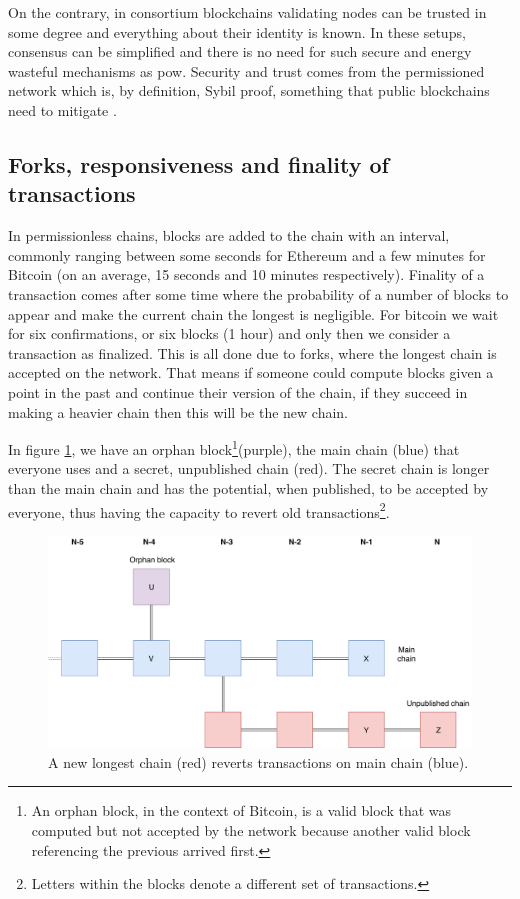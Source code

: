 On the contrary, in consortium blockchains validating nodes can be trusted in some degree and everything about their identity is known. In these setups, consensus can be simplified and there is no need for such secure and energy wasteful mechanisms as \gls{pow}. Security and trust comes from the permissioned network which is, by definition, Sybil proof, something that public blockchains need to mitigate\cite{dionyziz-sybil} \cite{mitigate-sybil}.

\subsection{Forks, responsiveness and finality of transactions}
In permissionless chains, blocks are added to the chain with an interval, commonly ranging between some seconds for Ethereum and a few minutes for Bitcoin (on an average, 15 seconds and 10 minutes respectively). Finality of a transaction comes after some time where the probability of a number of blocks to appear and make the current chain the longest is negligible. For bitcoin we wait for six confirmations, or six blocks (1 hour) and only then we consider a transaction as finalized. This is all done due to forks, where the longest chain is accepted on the network. That means if someone could compute blocks given a point in the past and continue their version of the chain, if they succeed in making a heavier chain then this will be the new chain. 

In figure \ref{fig:longest-chain}, we have an orphan block\footnote{An orphan block, in the context of Bitcoin, is a valid block that was computed but not accepted by the network because another valid block referencing the previous arrived first.}(purple), the main chain (blue) that everyone uses and a secret, unpublished chain (red). The secret chain is longer than the main chain and has the potential, when published, to be accepted by everyone, thus having the capacity to revert old transactions\footnote{Letters within the blocks denote a different set of transactions.}.  
\begin{figure}[h]
    \centering
    \includegraphics[width=1\textwidth]{images/forks.png}
    \caption{A new longest chain (red) reverts transactions on main chain (blue).}
    \label{fig:longest-chain}
\end{figure}

